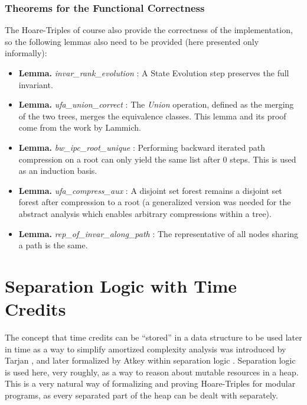 \documentclass[headsepline,footsepline,footinclude=false,oneside,fontsize=11pt,paper=a4,listof=totoc,bibliography=totoc]{scrbook} %
\begin{document}
\subsubsection{Theorems for the Functional Correctness}

The Hoare-Triples of course also provide the correctness of the implementation, so the following lemmas also need to be provided (here presented only informally):

\begin{itemize}
	\item \textbf{Lemma. }\textit{invar\_rank\_evolution} \eqnum: A State Evolution step preserves the full invariant.
	\item \textbf{Lemma. }\textit{ufa\_union\_correct} \eqnum: The \textit{Union} operation, defined as the merging of the two trees, merges the equivalence classes. This lemma and its proof come from the work by Lammich.
	\item \textbf{Lemma. }\textit{bw\_ipc\_root\_unique} \eqnum: Performing backward iterated path compression on a root can only yield the same list after $0$ steps. This is used as an induction basis.
	\item \textbf{Lemma. }\textit{ufa\_compress\_aux} \eqnum: A disjoint set forest remains a disjoint set forest after compression to a root (a generalized version was needed for the abstract analysis which enables arbitrary compressions within a tree).
	\item \textbf{Lemma. }\textit{rep\_of\_invar\_along\_path} \eqnum: The representative of all nodes sharing a path is the same.
\end{itemize}

\section{Separation Logic with Time Credits}

The concept that time credits can be ``stored'' in a data structure to be used later in time as a way to simplify amortized complexity analysis was introduced by Tarjan \cite{Tarjan85}, and later formalized by Atkey \cite{Atkey10} within separation logic \cite{Reynolds02}. Separation logic is used here, very roughly, as a way to reason about mutable resources in a heap. This is a very natural way of formalizing and proving Hoare-Triples for modular programs, as every separated part of the heap can be dealt with separately.
\end{document}
